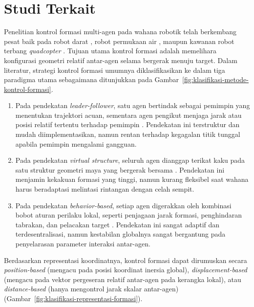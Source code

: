 \documentclass[12pt,a4paper]{report}
\begin{document}
\section{Studi Terkait}
Penelitian kontrol formasi multi-agen pada wahana robotik telah berkembang pesat baik pada robot darat \cite{garciaCooperativeFormationControl2025}, robot permukaan air \cite{fangMultiAgentGenerativeAdversarial2025}, maupun kawanan robot terbang \textit{quadcopter} \cite{brescianiniNonlinearQuadrocopterAttitude2013a, johnBobzwikQuadcopter_SimCon2025}. Tujuan utama kontrol formasi adalah memelihara konfigurasi geometri relatif antar-agen selama bergerak menuju target. Dalam literatur, strategi kontrol formasi umumnya diklasifikasikan ke dalam tiga paradigma utama \cite{kurochkinMethodsFormationControl2021} sebagaimana ditunjukkan pada Gambar~\ref{fig:klasifikasi-metode-kontrol-formasi}.
\begin{enumerate}
    \item Pada pendekatan \textit{leader-follower}, satu agen bertindak sebagai pemimpin yang menentukan trajektori acuan, sementara agen pengikut menjaga jarak atau posisi relatif tertentu terhadap pemimpin \cite{abroComprehensiveReviewNextGen2025}. Pendekatan ini terstruktur dan mudah diimplementasikan, namun rentan terhadap kegagalan titik tunggal apabila pemimpin mengalami gangguan.
    \item Pada pendekatan \textit{virtual structure}, seluruh agen dianggap terikat kaku pada satu struktur geometri maya yang bergerak bersama \cite{renFormationFeedbackControl2004, moreiraControllingVirtualStructure2024}. Pendekatan ini menjamin kekakuan formasi yang tinggi, namun kurang fleksibel saat wahana harus beradaptasi melintasi rintangan dengan celah sempit.
    \item Pada pendekatan \textit{behavior-based}, setiap agen digerakkan oleh kombinasi bobot aturan perilaku lokal, seperti penjagaan jarak formasi, penghindaran tabrakan, dan pelacakan target \cite{balchBehaviorbasedFormationControl1998}. Pendekatan ini sangat adaptif dan terdesentralisasi, namun kestabilan globalnya sangat bergantung pada penyelarasan parameter interaksi antar-agen.
\end{enumerate}

Berdasarkan representasi koordinatnya, kontrol formasi dapat dirumuskan secara \textit{position-based} (mengacu pada posisi koordinat inersia global), \textit{displacement-based} (mengacu pada vektor pergeseran relatif antar-agen pada kerangka lokal), atau \textit{distance-based} (hanya mengontrol jarak skalar antar-agen) \cite{ohSurveyMultiagentFormation2015} (Gambar~\ref{fig:klasifikasi-representasi-formasi}).
\end{document}
